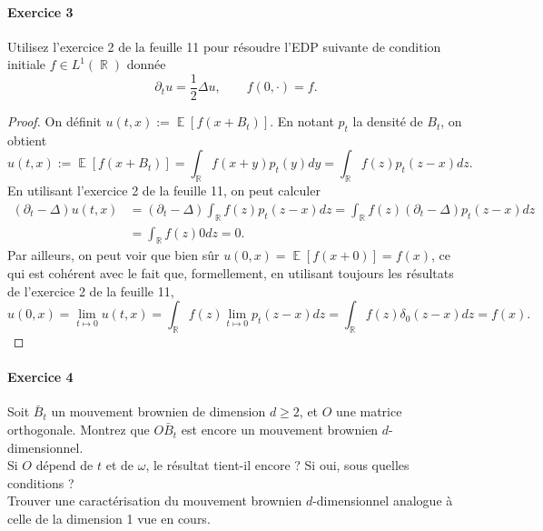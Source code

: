 \documentclass{article}
\theoremstyle{definition}
\numberwithin{equation}{section}
\DeclareMathOperator{\R}{\mathbb{R}}
\DeclareMathOperator{\E}{\mathbb{E}}
\begin{document}
\paragraph{Exercice 3} Utilisez l'exercice 2 de la feuille 11 pour résoudre l'EDP suivante de condition initiale $f\in L^1(\R)$ donnée
$$ \partial_t u = \dfrac{1}{2}\Delta u, \qquad f(0,\cdot)=f. $$

\begin{proof}
On définit $u(t,x):=\E[f(x+B_t)]$. En notant $p_t$ la densité de $B_t$, on obtient
$$u(t,x):=\E[f(x+B_t)] = \int_{\R} f(x+y)p_t(y)dy = \int_{\R} f(z)p_t(z-x)dz.$$
En utilisant l'exercice 2 de la feuille 11, on peut calculer
\begin{align*}
    (\partial_t - \Delta)u(t,x) &= (\partial_t - \Delta)\int_{\R} f(z)p_t(z-x)dz = \int_{\R} f(z)(\partial_t - \Delta)p_t(z-x)dz\\
    &= \int_{\R} f(z)0dz=0.
\end{align*}
Par ailleurs, on peut voir que bien sûr $u(0,x)=\E[f(x+0)]=f(x)$, ce qui est cohérent avec le fait que, formellement, en utilisant toujours les résultats de l'exercice 2 de la feuille 11,
$$ u(0,x) = \lim_{t\mapsto 0} u(t,x) = \int_{\R} f(z)\lim_{t\mapsto 0} p_t(z-x)dz = \int_{\R} f(z)\delta_0(z-x)dz=f(x).$$
\end{proof}


\paragraph{Exercice 4} Soit $\bar{B}_t$ un mouvement brownien de dimension $d\geq 2$, et $O$ une matrice orthogonale. Montrez que $O\bar{B}_t$ est encore un mouvement brownien $d$-dimensionnel.\\
Si $O$ dépend de $t$ et de $\omega$, le résultat tient-il encore ? Si oui, sous quelles conditions ? \\
Trouver une caractérisation du mouvement brownien $d$-dimensionnel analogue à celle de la dimension 1 vue en cours.\\
\end{document}
